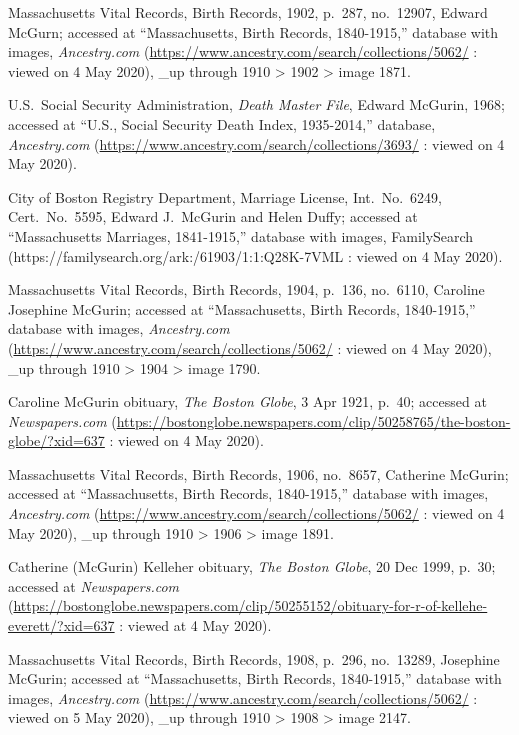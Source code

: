 \begin{thebibliography}{999}
	Massachusetts Vital Records, Birth Records, 1902, p.\ 287, no.\ 12907, Edward McGurn; accessed at ``Massachusetts, Birth Records, 1840-1915,'' database with images, \textit{Ancestry.com} (\url{https://www.ancestry.com/search/collections/5062/} : viewed on 4 May 2020), \_up through 1910 > 1902 > image 1871.
	
	U.S.\ Social Security Administration, \textit{Death Master File}, Edward McGurin, 1968; accessed at ``U.S., Social Security Death Index, 1935-2014,'' database, \textit{Ancestry.com} (\url{https://www.ancestry.com/search/collections/3693/} : viewed on 4 May 2020).
	
	City of Boston Registry Department, Marriage License, Int.\ No.\ 6249, Cert.\ No.\ 5595, Edward J.\ McGurin and Helen Duffy; accessed at ``Massachusetts Marriages, 1841-1915,'' database with images, FamilySearch (https://familysearch.org/ark:/61903/1:1:Q28K-7VML : viewed on 4 May 2020).
	
	Massachusetts Vital Records, Birth Records, 1904, p.\ 136, no.\ 6110, Caroline Josephine McGurin; accessed at ``Massachusetts, Birth Records, 1840-1915,'' database with images, \textit{Ancestry.com} (\url{https://www.ancestry.com/search/collections/5062/} : viewed on 4 May 2020), \_up through 1910 > 1904 > image 1790.	
	
	Caroline McGurin obituary, \textit{The Boston Globe}, 3 Apr 1921, p.\ 40; accessed at \textit{Newspapers.com} (\url{https://bostonglobe.newspapers.com/clip/50258765/the-boston-globe/?xid=637} : viewed on 4 May 2020).
	
	Massachusetts Vital Records, Birth Records, 1906, no.\ 8657, Catherine McGurin; accessed at ``Massachusetts, Birth Records, 1840-1915,'' database with images, \textit{Ancestry.com} (\url{https://www.ancestry.com/search/collections/5062/} : viewed on 4 May 2020), \_up through 1910 > 1906 > image 1891.	
		
	Catherine (McGurin) Kelleher obituary, \textit{The Boston Globe}, 20 Dec 1999, p.\ 30; accessed at \textit{Newspapers.com} (\url{https://bostonglobe.newspapers.com/clip/50255152/obituary-for-r-of-kellehe-everett/?xid=637} : viewed at 4 May 2020).
	
	Massachusetts Vital Records, Birth Records, 1908, p.\ 296, no.\ 13289, Josephine McGurin; accessed at ``Massachusetts, Birth Records, 1840-1915,'' database with images, \textit{Ancestry.com} (\url{https://www.ancestry.com/search/collections/5062/} : viewed on 5 May 2020), \_up through 1910 > 1908 > image 2147.	
	

\end{thebibliography}
